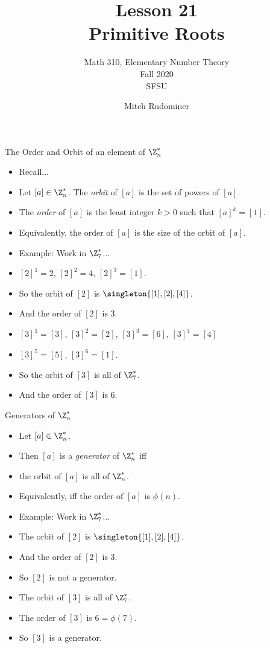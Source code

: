 \documentclass{beamer}
\title{Lesson 21 \\ Primitive Roots}
\subtitle{Math 310, Elementary Number Theory \\ Fall 2020 \\ SFSU}
\author{Mitch Rudominer}
\date{}
\begin{document}
\begin{frame}
  \titlepage
\end{frame}

\begin{frame}{The Order and Orbit of an element of $\Z_n^*$}

\begin{itemize}
  \item Recall...
  \item Let $[a]\in\Z^*_n$. The \emph{orbit} of $[a]$ is
  the set of powers of $[a]$.
  \item The \emph{order} of $[a]$ is
  the least integer $k>0$ such that $[a]^k=[1]$.
  \item Equivalently, the order of $[a]$ is the size of the orbit of $[a]$.
  \item Example: Work in $\Z^*_7$...
  \item $[2]^1 = 2$, $[2]^2 = 4$, $[2]^3=[1]$.
  \item So the orbit of $[2]$ is $\singleton{[1],[2],[4]}$.
  \item And the order of $[2]$ is $3$.
  \item $[3]^1=[3]$, $[3]^2=[2]$, $[3]^3=[6]$, $[3]^4=[4]$
  \item $[3]^5=[5]$, $[3]^6=[1]$.
  \item So the orbit of $[3]$ is all of $\Z^*_7$.
  \item And the order of $[3]$ is $6$.
\end{itemize}

\end{frame}

\begin{frame}{Generators of $\Z_n^*$}

\begin{itemize}
  \item Let $[a]\in\Z^*_n$.
  \item Then $[a]$ is a \emph{generator} of $\Z_n^*$ iff
  \item the orbit of $[a]$ is all of $\Z_n^*$.
  \item Equivalently, iff the order of $[a]$ is $\phi(n)$.
  \item Example: Work in $\Z^*_7$...
  \item The orbit of $[2]$ is $\singleton{[1],[2],[4]}$.
  \item And the order of $[2]$ is $3$.
  \item So $[2]$ is not a generator.
  \item The orbit of $[3]$ is all of $\Z^*_7$.
  \item The order of $[3]$ is $6 = \phi(7)$.
  \item So $[3]$ is a generator.
\end{itemize}

\end{frame}
\end{document}
